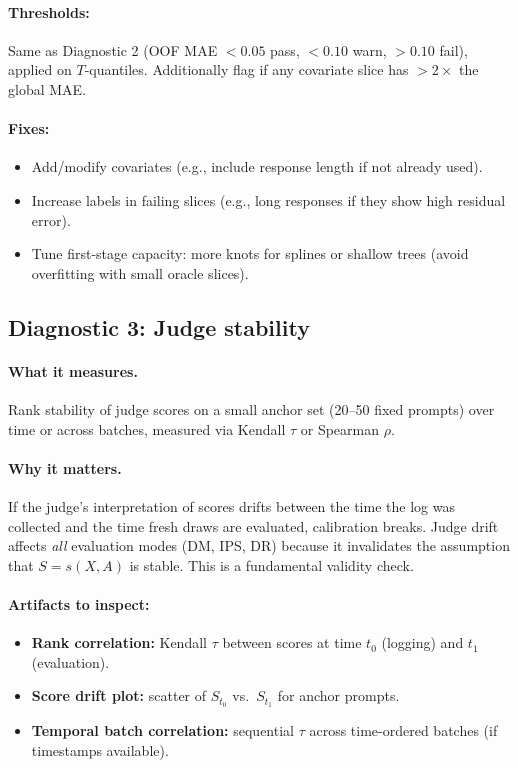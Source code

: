 \paragraph{Thresholds:}
Same as Diagnostic 2 (OOF MAE $< 0.05$ pass, $< 0.10$ warn, $> 0.10$ fail), applied on $T$-quantiles. Additionally flag if any covariate slice has $> 2\times$ the global MAE.

\paragraph{Fixes:}
\begin{itemize}
\item Add/modify covariates (e.g., include response length if not already used).
\item Increase labels in failing slices (e.g., long responses if they show high residual error).
\item Tune first-stage capacity: more knots for splines or shallow trees (avoid overfitting with small oracle slices).
\end{itemize}

\subsection{Diagnostic 3: Judge stability}

\paragraph{What it measures.} Rank stability of judge scores on a small anchor set (20--50 fixed prompts) over time or across batches, measured via Kendall $\tau$ or Spearman $\rho$.

\paragraph{Why it matters.} If the judge's interpretation of scores drifts between the time the log was collected and the time fresh draws are evaluated, calibration breaks. Judge drift affects \emph{all} evaluation modes (DM, IPS, DR) because it invalidates the assumption that $S = s(X, A)$ is stable. This is a fundamental validity check.

\paragraph{Artifacts to inspect:}
\begin{itemize}
\item \textbf{Rank correlation:} Kendall $\tau$ between scores at time $t_0$ (logging) and $t_1$ (evaluation).
\item \textbf{Score drift plot:} scatter of $S_{t_0}$ vs.\ $S_{t_1}$ for anchor prompts.
\item \textbf{Temporal batch correlation:} sequential $\tau$ across time-ordered batches (if timestamps available).
\end{itemize}

